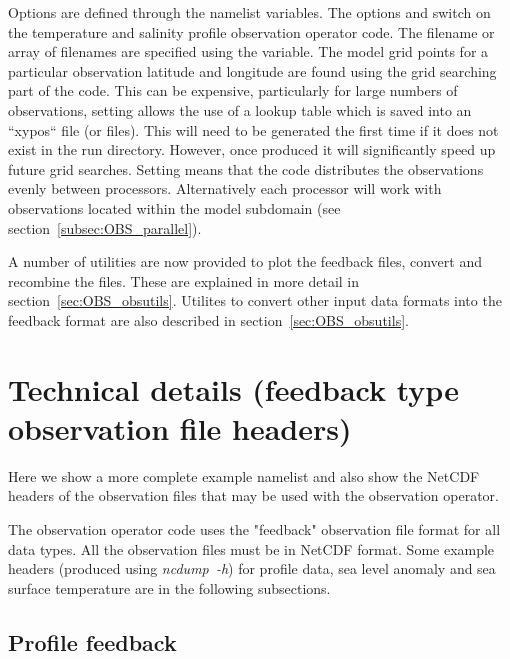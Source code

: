 \documentclass[../main/NEMO_manual]{subfiles}
\begin{document}
Options are defined through the  namelist variables.
The options  and  switch on the temperature and salinity profile observation operator code.
The filename or array of filenames are specified using the  variable.
The model grid points for a particular observation latitude and longitude are found using
the grid searching part of the code.
This can be expensive, particularly for large numbers of observations,
setting  allows the use of a lookup table which
is saved into an ``xypos`` file (or files).
This will need to be generated the first time if it does not exist in the run directory.
However, once produced it will significantly speed up future grid searches.
Setting  means that the code distributes the observations evenly between processors.
Alternatively each processor will work with observations located within the model subdomain
(see section~\autoref{subsec:OBS_parallel}).

A number of utilities are now provided to plot the feedback files, convert and recombine the files.
These are explained in more detail in section~\autoref{sec:OBS_obsutils}.
Utilites to convert other input data formats into the feedback format are also described in
section~\autoref{sec:OBS_obsutils}.

\section{Technical details (feedback type observation file headers)}
\label{sec:OBS_details}

Here we show a more complete example namelist  and also show the NetCDF headers of
the observation files that may be used with the observation operator.



The observation operator code uses the "feedback" observation file format for all data types.
All the observation files must be in NetCDF format.
Some example headers (produced using \mbox{\textit{ncdump~-h}}) for profile data, sea level anomaly and
sea surface temperature are in the following subsections.

\subsection{Profile feedback}
\end{document}

